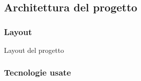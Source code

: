 \documentclass[xcolor=svgnames, aspectratio=169]{beamer}
\begin{document}

\subsection{Architettura del progetto}

\subsubsection{Layout}

\begin{frame}{Layout del progetto}
    \vspace*{-56pt}
    \begin{figure}[H]
        \centering
        \noindent{}
    \end{figure}
\end{frame}


\subsubsection{Tecnologie usate}
\end{document}

